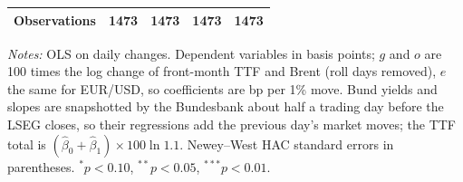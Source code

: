 \documentclass[11pt,a4paper]{article}
\begin{document}
\begin{table}[htbp]
\begin{tabular}{@{}l*{4}{c}@{}}
Observations & 1473 & 1473 & 1473 & 1473\\
\bottomrule
\end{tabular}
\par\vspace{4pt}\begin{minipage}{0.94\textwidth}\scriptsize\textit{Notes:} OLS on daily changes. Dependent variables in basis points; $g$ and $o$ are 100 times the log change of front-month TTF and Brent (roll days removed), $e$ the same for EUR/USD, so coefficients are bp per 1\% move. Bund yields and slopes are snapshotted by the Bundesbank about half a trading day before the LSEG closes, so their regressions add the previous day's market moves; the TTF total is $(\hat\beta_0+\hat\beta_1)\times 100\ln 1.1$. Newey--West HAC standard errors in parentheses. $^{*}p<0.10$, $^{**}p<0.05$, $^{***}p<0.01$.\end{minipage}
\end{table}
\end{document}
